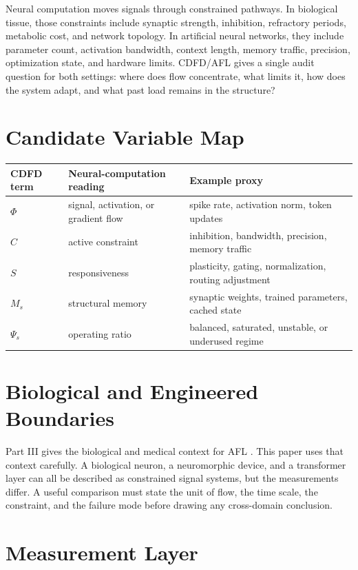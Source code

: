 \documentclass[12pt,a4paper]{article}
\begin{document}
Neural computation moves signals through constrained pathways. In biological
tissue, those constraints include synaptic strength, inhibition, refractory
periods, metabolic cost, and network topology. In artificial neural networks,
they include parameter count, activation bandwidth, context length, memory
traffic, precision, optimization state, and hardware limits. CDFD/AFL gives a
single audit question for both settings: where does flow concentrate, what
limits it, how does the system adapt, and what past load remains in the
structure?

\section{Candidate Variable Map}

\begin{table}[h]
\centering
\begin{tabularx}{\textwidth}{@{}lXX@{}}
\toprule
CDFD term & Neural-computation reading & Example proxy \\
\midrule
$\Phi$ & signal, activation, or gradient flow & spike rate, activation norm, token updates \\
$C$ & active constraint & inhibition, bandwidth, precision, memory traffic \\
$S$ & responsiveness & plasticity, gating, normalization, routing adjustment \\
$M_s$ & structural memory & synaptic weights, trained parameters, cached state \\
$\Psi_s$ & operating ratio & balanced, saturated, unstable, or underused regime \\
\bottomrule
\end{tabularx}
\end{table}

\section{Biological and Engineered Boundaries}

Part III gives the biological and medical context for AFL \cite{MujjabiPartIII2026}.
This paper uses that context carefully. A biological neuron, a neuromorphic
device, and a transformer layer can all be described as constrained signal
systems, but the measurements differ. A useful comparison must state the unit
of flow, the time scale, the constraint, and the failure mode before drawing
any cross-domain conclusion.

\section{Measurement Layer}
\end{document}
